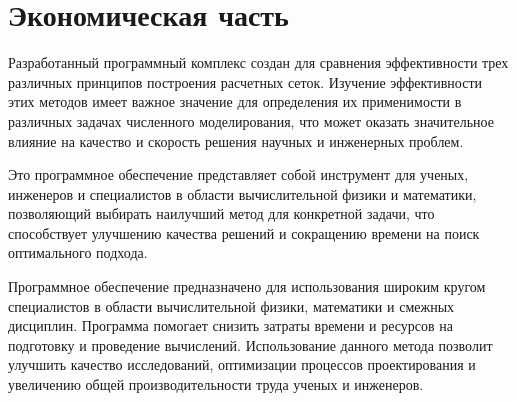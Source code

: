\documentclass[a4paper,14pt,russian]{extreport}
\renewcommand{\_}{\kern-1.5pt\textunderscore\kern-1.5pt}
\begin{document}
	\chapter{Экономическая часть}
	\par Разработанный программный комплекс создан для сравнения эффективности трех различных принципов построения расчетных сеток. Изучение эффективности этих методов имеет важное значение для определения их применимости в различных задачах численного моделирования, что может оказать значительное влияние на качество и скорость решения научных и инженерных проблем.

Это программное обеспечение представляет собой инструмент для ученых, инженеров и специалистов в области вычислительной физики и математики, позволяющий выбирать наилучший метод для конкретной задачи, что способствует улучшению качества решений и сокращению времени на поиск оптимального подхода.
	\par Программное обеспечение предназначено для использования широким кругом специалистов в области вычислительной физики, математики и смежных дисциплин. Программа помогает снизить затраты времени и ресурсов на подготовку и проведение вычислений. Использование данного метода позволит улучшить качество исследований, оптимизации процессов проектирования и увеличению общей производительности труда ученых и инженеров.
\end{document}
